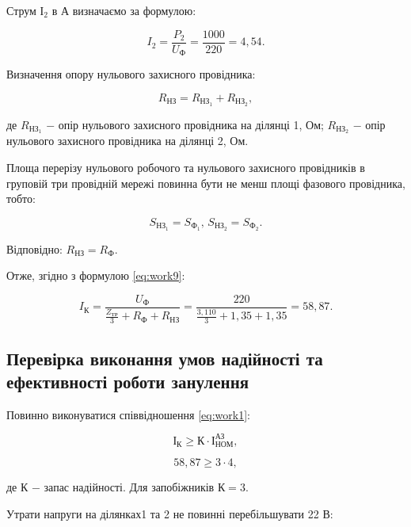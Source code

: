 \vspace{1.5em}

Струм $І_{2}$ в А визначаємо за формулою:

\[
	I_{2} = \frac{P_{2}}{U_{\text{Ф}}} = \frac{1000}{220} = 4,54.
\]

\vspace{1.5em}

Визначення опору нульового захисного провідника:

\begin{equation}\label{eq:work14}
	R_{\text{НЗ}} = R_{\text{НЗ}_{1}} + R_{\text{НЗ}_{2}},
\end{equation}

\noindent де $R_{\text{НЗ}_{1}}$ $-$ опір нульового захисного провідника на ділянці 1, Ом;\newline
\hspace*{15pt} $R_{\text{НЗ}_{2}}$ $-$ опір нульового захисного провідника на ділянці 2, Ом.

Площа перерізу нульового робочого та нульового захисного провідників в груповій три провідній мережі повинна бути не менш площі фазового провідника, тобто:

\[
	S_{\text{НЗ}_{1}} = S_{\text{Ф}_{1}}, \, S_{\text{НЗ}_{2}} = S_{\text{Ф}_{2}}.
\]

\vspace{1.5em}

Відповідно: $R_{\text{НЗ}} = R_{\text{Ф}}$.

Отже, згідно з формулою \ref{eq:work9}:

\[
	I_{\text{К}} = \frac{U_{\text{Ф}}}{\frac{Z_{\text{ТР}}}{3} + R_{\text{Ф}} + R_{\text{НЗ}}} = \frac{220}{\frac{3,110}{3} + 1,35 + 1,35} = 58,87.
\]

\subsection{Перевірка виконання умов надійності та ефективності роботи занулення}

Повинно виконуватися співвідношення \ref{eq:work1}:

\[
	\text{І}_{\text{К}} \ge \text{К} \cdot \text{І}^{\text{АЗ}}_{\text{НОМ}},
\]

\[
	58,87 \ge 3 \cdot 4,
\]

\noindent де $\text{К}$ $-$ запас надійності. Для запобіжників $\text{К} = 3$.

\vspace{1.5em}

Утрати напруги на ділянках1 та 2 не повинні перебільшувати 22 В:

